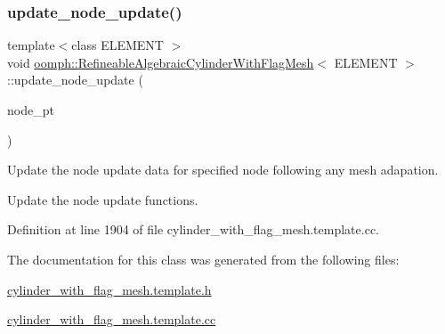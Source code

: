 \subsubsection{\texorpdfstring{update\+\_\+node\+\_\+update()}{update\_node\_update()}}
{\footnotesize\ttfamily template$<$class E\+L\+E\+M\+E\+NT $>$ \\
void \hyperlink{classoomph_1_1RefineableAlgebraicCylinderWithFlagMesh}{oomph\+::\+Refineable\+Algebraic\+Cylinder\+With\+Flag\+Mesh}$<$ E\+L\+E\+M\+E\+NT $>$\+::update\+\_\+node\+\_\+update (\begin{DoxyParamCaption}\item[{Algebraic\+Node $\ast$\&}]{node\+\_\+pt }\end{DoxyParamCaption})}



Update the node update data for specified node following any mesh adapation. 

Update the node update functions. 

Definition at line 1904 of file cylinder\+\_\+with\+\_\+flag\+\_\+mesh.\+template.\+cc.



The documentation for this class was generated from the following files\+:\begin{DoxyCompactItemize}
\item 
\hyperlink{cylinder__with__flag__mesh_8template_8h}{cylinder\+\_\+with\+\_\+flag\+\_\+mesh.\+template.\+h}\item 
\hyperlink{cylinder__with__flag__mesh_8template_8cc}{cylinder\+\_\+with\+\_\+flag\+\_\+mesh.\+template.\+cc}\end{DoxyCompactItemize}
